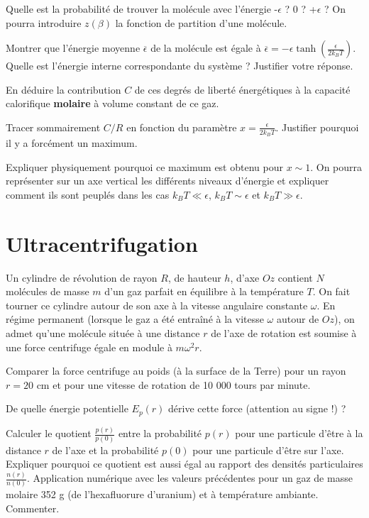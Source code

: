 \documentclass[utf8, 11pt]{feuille}
\begin{document}
\question
Quelle est la probabilité de trouver la molécule avec l'énergie -$\epsilon$ ? 0 ? +$\epsilon$ ? On pourra introduire $z(\beta)$ la fonction de partition d'une molécule.

\question
Montrer que l'énergie  moyenne $\overline{\epsilon}$ de la molécule est égale à $\overline{\epsilon}=- \epsilon \tanh ( \frac{\epsilon}{2k_BT})$. Quelle est l'énergie interne correspondante du système  ? Justifier votre réponse.

\question
En déduire la contribution $C$ de ces degrés de liberté énergétiques à la capacité calorifique \textbf{molaire} à volume constant de ce gaz.

\question
Tracer sommairement $C/R$ en fonction du paramètre $x=\frac{\epsilon}{2k_BT}$. Justifier pourquoi il y a forcément un maximum.

\question
Expliquer physiquement pourquoi ce maximum est obtenu pour $x \sim 1$. On pourra représenter sur un axe vertical les différents niveaux d'énergie et expliquer comment ils sont peuplés  dans les cas $k_BT \ll \epsilon$, $k_BT \sim \epsilon$ et $k_BT \gg \epsilon$.


\section{Ultracentrifugation}

Un cylindre de révolution de rayon $R$, de hauteur $h$, d'axe $Oz$ contient $N$ molécules de masse $m$ d'un
gaz parfait en équilibre à la température $T$. On fait tourner ce cylindre autour de son axe
à la vitesse angulaire constante $\omega$. En régime permanent (lorsque le gaz a  été entraîné à la vitesse $\omega$ autour de $Oz$),  on admet qu'une molécule située à une distance $r$ de l'axe de rotation est soumise à une force centrifuge égale en module à $m\omega^2 r$.

\question
Comparer la force centrifuge au poids (à la surface de la Terre)  pour un rayon $r=20$ cm et pour une vitesse de rotation de 10 000 tours par minute.

\question
De quelle énergie potentielle $E_p(r)$ dérive cette force (attention au signe !) ?

\question
Calculer le quotient $\frac{p(r)}{p(0)}$ entre la probabilité $p(r)$ pour une particule d'être à la distance $r$ de l'axe et la probabilité $p(0)$ pour une particule d'être sur l'axe. Expliquer pourquoi ce quotient est aussi égal au rapport des densités particulaires  $\frac{n(r)}{n(0)}$. Application numérique avec les valeurs précédentes pour un gaz de masse molaire 352 g (de l'hexafluorure d'uranium) et à température ambiante. Commenter.
\end{document}
